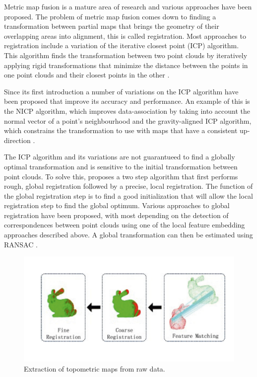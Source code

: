 Metric map fusion is a mature area of research and various approaches have been proposed. The problem of metric map fusion comes down to finding a transformation between partial maps that brings the geometry of their overlapping areas into alignment, this is called registration. Most approaches to registration include a variation of the iterative closest point (ICP) algorithm. This algorithm finds the transformation between two point clouds by iteratively applying rigid transformations that minimize the distance between the points in one point clouds and their closest points in the other \citep{rusinkiewicz_efficient_2001}. 

Since its first introduction a number of variations on the ICP algorithm have been proposed that improve its accuracy and performance. An example of this is the NICP algorithm, which improves data-association by taking into account the normal vector of a point's neighbourhood \citep{serafin_nicp_2015} and the gravity-aligned ICP algorithm, which constrains the transformation to use with maps that have a consistent up-direction \citep{kubelka_gravity-constrained_2022}. 

The ICP algorithm and its variations are not guarantueed to find a globally optimal transformation and is sensitive to the initial transformation between point clouds. To solve this, \citet{yang_fast_2016} proposes a two step algorithm that first performs rough, global registration followed by a precise, local registration. The function of the global registration step is to find a good initialization that will allow the local registration step to find the global optimum. Various approaches to global registration have been proposed, with most depending on the detection of correspondences between point clouds using one of the local feature embedding approaches described above. A global transformation can then be estimated using RANSAC \citep{koguciuk_parallel_2017}.

\begin{figure}[h]
    \centering
    \includegraphics*[width=\textwidth]{./fig/feature_matching.png}
    \caption{Extraction of topometric maps from raw data.}
    \label{fig:global_local}
\end{figure}

